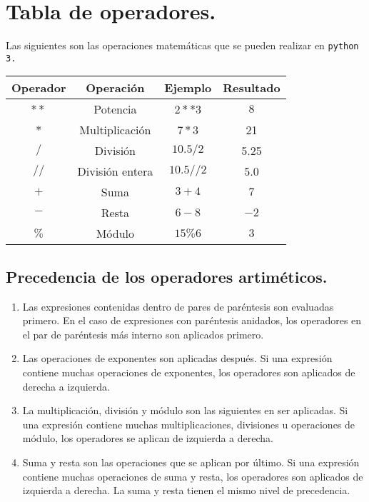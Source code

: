 \documentclass[11pt]{article}
\begin{document}
\section{Tabla de operadores.}\label{tabla-de-operadores}
Las siguientes son las operaciones matemáticas que se pueden realizar en \texttt{python 3.}
\begin{center}
\begin{tabular}{| c | c | c | c |}
\hline
Operador & Operación & Ejemplo & Resultado \\
\hline
\hline
$**$ & Potencia & $2**3$ & $8$ \\
$*$ & Multiplicación & $7*3$ & 21 \\
$/$ & División & $10.5/2$ & 5.25 \\
$//$ & División entera & $10.5//2$ & 5.0 \\
$+$ & Suma & $3+4$ & $7$ \\
$-$ & Resta & $6-8$ & $-2$ \\
$\%$ & Módulo & $15\%6$ & $3$ \\
\hline
\end{tabular}
\end{center}
\subsection{Precedencia de los operadores artiméticos.}\label{precedencia-de-los-operadores-artimuxe9ticos}
\begin{enumerate}
\def\labelenumi{\arabic{enumi}.}
\itemsep1pt\parskip0pt
\item Las expresiones contenidas dentro de pares de paréntesis son evaluadas primero. En el caso de expresiones con paréntesis anidados, los operadores en el par de paréntesis más interno son aplicados primero.
\item Las operaciones de exponentes son aplicadas después. Si una expresión contiene muchas operaciones de exponentes, los operadores son aplicados de derecha a izquierda.
\item La multiplicación, división y módulo son las siguientes en ser aplicadas. Si una expresión contiene muchas multiplicaciones, divisiones u operaciones de módulo, los operadores se aplican de   izquierda a derecha.
\item Suma y resta son las operaciones que se aplican por último. Si una expresión contiene muchas operaciones de suma y resta, los operadores son aplicados de izquierda a derecha. La suma y resta tienen el mismo nivel de precedencia.
\end{enumerate}
\end{document}
